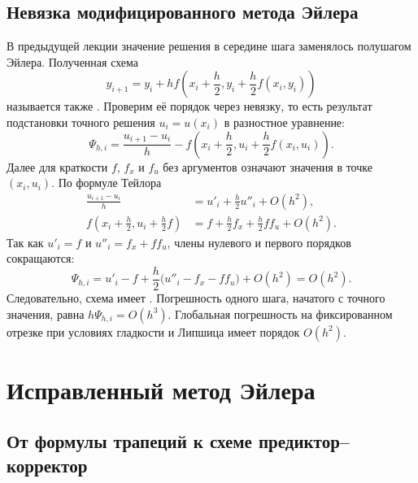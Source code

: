 \documentclass[../final.tex]{subfiles}
\begin{document}
\ifSubfilesClassLoaded{\setcounter{chapter}{5}\setcounter{section}{3}}{}
\captionsetup{font=footnotesize,labelfont=bf,skip=5pt}

\subsection{Невязка модифицированного метода Эйлера}

В предыдущей лекции значение решения в середине шага заменялось
полушагом Эйлера. Полученная схема
\begin{equation*}
    y_{i+1}=y_i+h f\!\left(x_i+\frac h2,
    y_i+\frac h2 f(x_i,y_i)\right)
\end{equation*}
называется также .
Проверим её порядок через невязку, то есть результат подстановки
точного решения $u_i=u(x_i)$ в разностное уравнение:
\begin{equation*}
    \Psi_{h,i}=\frac{u_{i+1}-u_i}{h}
    -f\!\left(x_i+\frac h2,u_i+\frac h2 f(x_i,u_i)\right).
\end{equation*}
Далее для краткости $f$, $f_x$ и $f_u$ без аргументов означают значения
в точке $(x_i,u_i)$. По формуле Тейлора
\begin{align*}
    \frac{u_{i+1}-u_i}{h}
        &=u'_i+\frac h2u''_i+O(h^2),\\
    f\!\left(x_i+\frac h2,u_i+\frac h2f\right)
        &=f+\frac h2f_x+\frac h2f f_u+O(h^2).
\end{align*}
Так как $u'_i=f$ и $u''_i=f_x+f f_u$, члены нулевого и первого
порядков сокращаются:
\begin{equation*}
    \Psi_{h,i}
    =u'_i-f+\frac h2\bigl(u''_i-f_x-f f_u\bigr)+O(h^2)
    =O(h^2).
\end{equation*}
Следовательно, схема имеет .
Погрешность одного шага, начатого с точного значения, равна
$h\Psi_{h,i}=O(h^3)$. Глобальная погрешность на фиксированном отрезке
при условиях гладкости и Липшица имеет порядок $O(h^2)$.

\section{Исправленный метод Эйлера}

\subsection{От формулы трапеций к схеме предиктор--корректор}
\end{document}
